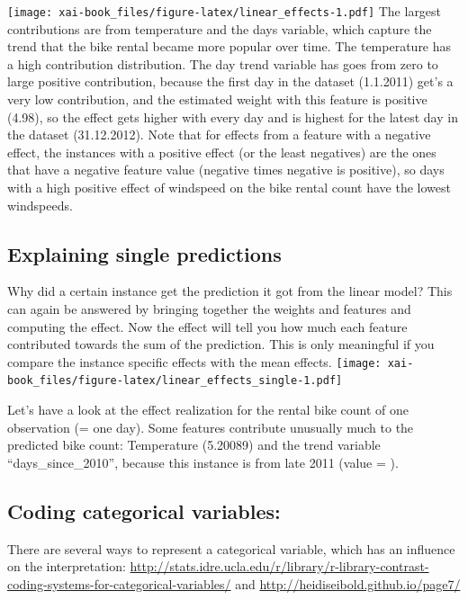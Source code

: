 \documentclass[12pt,]{krantz}
\theoremstyle{definition}
\theoremstyle{definition}
\theoremstyle{definition}
\theoremstyle{remark}
\begin{document}
\texttt{[image: xai-book\_files/figure-latex/linear\_effects-1.pdf]} The
largest contributions are from temperature and the days variable, which
capture the trend that the bike rental became more popular over time.
The temperature has a high contribution distribution. The day trend
variable has goes from zero to large positive contribution, because the
first day in the dataset (1.1.2011) get's a very low contribution, and
the estimated weight with this feature is positive (4.98), so the effect
gets higher with every day and is highest for the latest day in the
dataset (31.12.2012). Note that for effects from a feature with a
negative effect, the instances with a positive effect (or the least
negatives) are the ones that have a negative feature value (negative
times negative is positive), so days with a high positive effect of
windspeed on the bike rental count have the lowest windspeeds.

\subsection{Explaining single
predictions}\label{explaining-single-predictions}

Why did a certain instance get the prediction it got from the linear
model? This can again be answered by bringing together the weights and
features and computing the effect. Now the effect will tell you how much
each feature contributed towards the sum of the prediction. This is only
meaningful if you compare the instance specific effects with the mean
effects.
\texttt{[image: xai-book\_files/figure-latex/linear\_effects\_single-1.pdf]}

Let's have a look at the effect realization for the rental bike count of
one observation (= one day). Some features contribute unusually much to
the predicted bike count: Temperature (5.20089) and the trend variable
``days\_since\_2010'', because this instance is from late 2011 (value =
).

\subsection{Coding categorical
variables:}\label{coding-categorical-variables}

There are several ways to represent a categorical variable, which has an
influence on the interpretation:
\url{http://stats.idre.ucla.edu/r/library/r-library-contrast-coding-systems-for-categorical-variables/}
and \url{http://heidiseibold.github.io/page7/}
\end{document}
